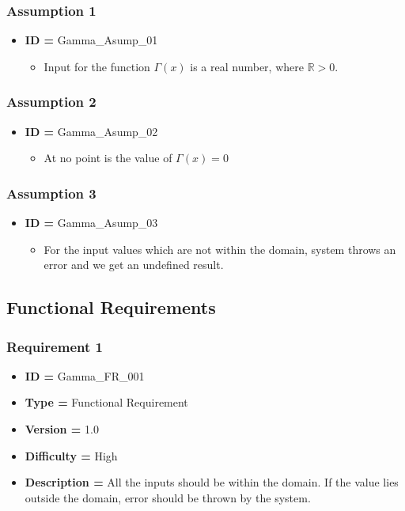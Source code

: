 \documentclass[12pt]{report}
\begin{document}
\subsubsection{Assumption 1}
\begin{itemize}
    \item \textbf{ID = }Gamma\_Asump\_01
    \begin{itemize}
        \item Input for the function $\Gamma(x)$ is a real number, where $\mathbb{R}>0.$
    \end{itemize}
\end{itemize}

\subsubsection{Assumption 2}
\begin{itemize}
    \item \textbf{ID = }Gamma\_Asump\_02
    \begin{itemize}
        \item At no point is the value of $\Gamma(x) = 0$
    \end{itemize}
\end{itemize}

\subsubsection{Assumption 3}
\begin{itemize}
    \item \textbf{ID = }Gamma\_Asump\_03
    \begin{itemize}
        \item For the input values which are not within the domain, system throws an error and we get an undefined result.
    \end{itemize}
\end{itemize}


\subsection{Functional Requirements}
\subsubsection{Requirement 1}
\begin{itemize}
    \item \textbf{ID = }Gamma\_FR\_001
    \item \textbf{Type = }Functional Requirement
    \item \textbf{Version = } 1.0
    \item \textbf{Difficulty = }High
    \item \textbf{Description = } All the inputs should be within the domain. If the value lies outside the domain, error should be thrown by the system.
\end{itemize}
\end{document}
